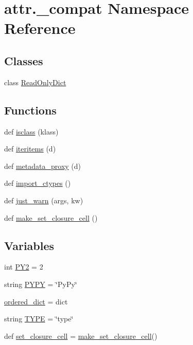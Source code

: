 \hypertarget{namespaceattr_1_1__compat}{}\section{attr.\+\_\+compat Namespace Reference}
\label{namespaceattr_1_1__compat}
\subsection*{Classes}
\begin{DoxyCompactItemize}
\item 
class \hyperlink{classattr_1_1__compat_1_1_read_only_dict}{Read\+Only\+Dict}
\end{DoxyCompactItemize}
\subsection*{Functions}
\begin{DoxyCompactItemize}
\item 
def \hyperlink{namespaceattr_1_1__compat_a529525094853e4ac7f75fa07e838b749}{isclass} (klass)
\item 
def \hyperlink{namespaceattr_1_1__compat_ae4db7daca1dce2b85955337bea02e0a9}{iteritems} (d)
\item 
def \hyperlink{namespaceattr_1_1__compat_a03120022bfdae93d7cbd3cf95d667d53}{metadata\+\_\+proxy} (d)
\item 
def \hyperlink{namespaceattr_1_1__compat_af86677ffeb442a606a72b93a848717cb}{import\+\_\+ctypes} ()
\item 
def \hyperlink{namespaceattr_1_1__compat_a3f82c63c6aa5e9eec442a57c64f79ae4}{just\+\_\+warn} (args, kw)
\item 
def \hyperlink{namespaceattr_1_1__compat_a8dccbbea3bd8babd13634172c5c44fbd}{make\+\_\+set\+\_\+closure\+\_\+cell} ()
\end{DoxyCompactItemize}
\subsection*{Variables}
\begin{DoxyCompactItemize}
\item 
int \hyperlink{namespaceattr_1_1__compat_a25608fc3995bbc240f3d238b820a8797}{P\+Y2} = 2
\item 
string \hyperlink{namespaceattr_1_1__compat_a89375e5fc29dfb01bd95a08943d13eb3}{P\+Y\+PY} = \char`\"{}Py\+Py\char`\"{}
\item 
\hyperlink{namespaceattr_1_1__compat_aa77f00cd859563f6fceb36be818fdcd5}{ordered\+\_\+dict} = dict
\item 
string \hyperlink{namespaceattr_1_1__compat_abadd328564f4b92b07baa73ebc821e25}{T\+Y\+PE} = \char`\"{}type\char`\"{}
\item 
def \hyperlink{namespaceattr_1_1__compat_ab9e39ec6546b8656dfebb3ac8afe61f1}{set\+\_\+closure\+\_\+cell} = \hyperlink{namespaceattr_1_1__compat_a8dccbbea3bd8babd13634172c5c44fbd}{make\+\_\+set\+\_\+closure\+\_\+cell}()
\end{DoxyCompactItemize}


